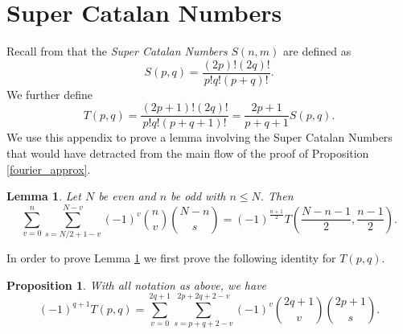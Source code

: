 \documentclass{amsart}
\theoremstyle{plain}
\newtheorem{lem}[equation]{Lemma}
\newtheorem{prop}[equation]{Proposition}
\theoremstyle{remark}
\begin{document}
\appendix

\section{Super Catalan Numbers} \label{super_appendix}

Recall from \cite[\S 6]{gessel} that the \emph{Super Catalan Numbers} $S(n,m)$ are defined as
\[
S(p,q) = \frac{(2p)!(2q)!}{p!q!(p+q)!}.
\]
We further define 
\[
T(p,q) = \frac{(2p+1)!(2q)!}{p!q!(p+q+1)!} = \frac{2p+1}{p + q +1} S(p,q).
\]
We use this appendix to prove a lemma involving the Super Catalan Numbers that would have detracted from the main flow of the proof of Proposition \ref{fourier_approx}. 

\begin{lem} \label{appendix_lemma}
Let $N$ be even and $n$ be odd with $n \leq N$.  Then
\[
\sum_{v=0}^n \sum_{s=N/2+1-v}^{N-v} (-1)^v\binom{n}{v}\binom{N-n}{s} = (-1)^{\frac{n+1}{2}}T\left( \frac{N-n-1}{2},\frac{n-1}{2}\right).
\]
\end{lem}

In order to prove Lemma \ref{appendix_lemma} we first prove the following identity for $T(p,q)$.

\begin{prop} \label{T(p,q)_identity}
With all notation as above, we have 
\[
(-1)^{q+1} T(p,q) = \sum_{v=0}^{2q+1} \sum_{s=p+q+2-v}^{2p+2q+2-v} (-1)^v \binom{2q+1}{v}\binom{2p+1}{s}.
\]
\end{prop}
\end{document}
